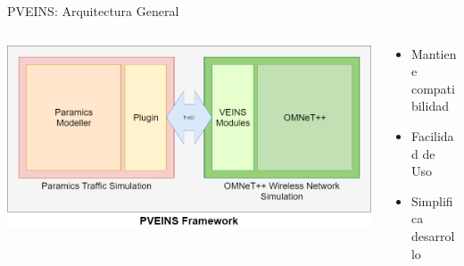 \documentclass[aspectratio=169]{beamer}
\begin{document}
\begin{frame}{PVEINS: Arquitectura General}
\begin{columns}
    \begin{column}{.7\linewidth}
        \centering
        \includegraphics[width=\linewidth]{figuras/PVEINSArch.png}
    \end{column}
    \begin{column}{.3\linewidth}
        \begin{itemize}
            \item Mantiene compatibilidad
            \item Facilidad de Uso
            \item Simplifica desarrollo
        \end{itemize}
    \end{column}
\end{columns}
\end{frame}
\end{document}

